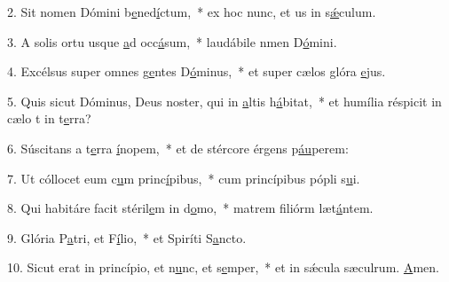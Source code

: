 2. Sit nomen Dómini b\uline{e}ned\uline{í}ctum,~* ex hoc nunc, et us in s\uline{ǽ}culum.\par 
3. A solis ortu usque \uline{a}d occ\uline{á}sum,~* laudábile nmen D\uline{ó}mini.\par 
4. Excélsus super omnes g\uline{e}ntes D\uline{ó}minus,~* et super cælos glóra \uline{e}jus.\par 
5. Quis sicut Dóminus, Deus noster, qui in \uline{a}ltis h\uline{á}bitat,~* et humília réspicit in cælo t in t\uline{e}rra?\par 
6. Súscitans a t\uline{e}rra \uline{í}nopem,~* et de stércore érgens p\uline{áu}perem:\par 
7. Ut cóllocet eum c\uline{u}m princ\uline{í}pibus,~* cum princípibus pópli s\uline{u}i.\par 
8. Qui habitáre facit stéril\uline{e}m in d\uline{o}mo,~* matrem filiórm læt\uline{á}ntem.\par 
9. Glória P\uline{a}tri, et F\uline{í}lio,~* et Spiríti S\uline{a}ncto.\par 
10. Sicut erat in princípio, et n\uline{u}nc, et s\uline{e}mper,~* et in sǽcula sæculrum. \uline{A}men.\par 
